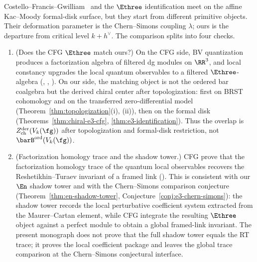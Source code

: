 \begin{remark}
%
%
Costello--Francis--Gwilliam~\cite{CFG25} and the $\Ethree$ identification
meet on the affine Kac--Moody formal-disk surface, but they start from
different primitive objects. Their deformation parameter is the
Chern--Simons coupling $\lambda$; ours is the departure from critical
level $k + h^\vee$. The comparison splits into four checks.
\begin{enumerate}[label=\textup{(\roman*)}]
\item \textup{(Does the CFG $\Ethree$ match ours?)}
 On the CFG side, BV quantization produces a factorization algebra of
 filtered dg modules on $\RR^3$, and local constancy upgrades the
 local quantum observables to a filtered $\Ethree$-algebra
 \textup{(}\cite[Theorem~1.2]{CFG25},
 \cite[Proposition~4.6]{CFG25},
 \cite[Lemma~4.9]{CFG25}\textup{)}. On our side, the matching object is
 not the ordered bar coalgebra but the derived chiral center after
 topologization: first on BRST cohomology and on the transferred
 zero-differential model
 \textup{(}Theorem~\textup{\ref{thm:topologization}(i), (ii)}\textup{)},
 then on the formal disk
 \textup{(}Theorems~\textup{\ref{thm:chiral-e3-cfg},
 \ref{thm:e3-identification}}\textup{)}. Thus the overlap is
 $Z^{\mathrm{der}}_{\mathrm{ch}}(V_k(\fg))$ after topologization and
 formal-disk restriction, not $\barB^{\mathrm{ord}}(V_k(\fg))$.

\item \textup{(Factorization homology trace and the shadow tower.)}
 CFG prove that the factorization homology trace of the quantum local
 observables recovers the Reshetikhin--Turaev invariant of a framed
 link \textup{(}\cite[Theorem~1.1]{CFG25}\textup{)}. This is
 consistent with our $\En$ shadow tower and with the
 Chern--Simons comparison conjecture
 \textup{(}Theorem~\textup{\ref{thm:en-shadow-tower}},
 Conjecture~\textup{\ref{conj:e3-chern-simons}}\textup{)}:
 the shadow tower records the local perturbative coefficient system
 extracted from the Maurer--Cartan element, while CFG integrate the
 resulting $\Ethree$ object against a perfect module to obtain a
 global framed-link invariant. The present monograph does not prove
 that the full shadow tower equals the RT trace; it proves the local
 coefficient package and leaves the global trace comparison at the
 Chern--Simons conjectural interface.


\end{enumerate}
\end{remark}
